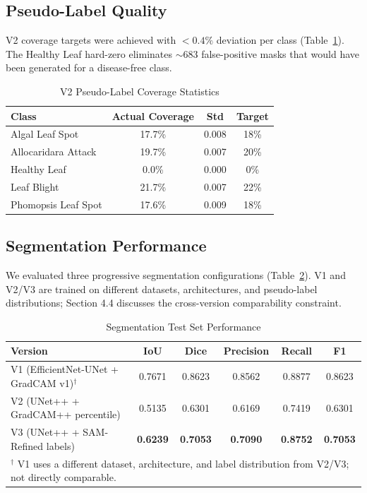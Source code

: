 \documentclass[10pt,a4paper]{article}
\begin{document}
\subsection{Pseudo-Label Quality}

V2 coverage targets were achieved with $<0.4\%$ deviation per class (Table~\ref{tab:v2_coverage}). The Healthy Leaf hard-zero eliminates $\sim$683 false-positive masks that would have been generated for a disease-free class.

\begin{table}[H]
\centering
\caption{V2 Pseudo-Label Coverage Statistics}
\label{tab:v2_coverage}
\begin{tabular}{lccc}
\toprule
\textbf{Class} & \textbf{Actual Coverage} & \textbf{Std} & \textbf{Target} \\
\midrule
Algal Leaf Spot     & 17.7\% & 0.008 & 18\% \\
Allocaridara Attack & 19.7\% & 0.007 & 20\% \\
Healthy Leaf        & 0.0\%  & 0.000 & 0\%  \\
Leaf Blight         & 21.7\% & 0.007 & 22\% \\
Phomopsis Leaf Spot & 17.6\% & 0.009 & 18\% \\
\bottomrule
\end{tabular}
\end{table}

\subsection{Segmentation Performance}

We evaluated three progressive segmentation configurations (Table~\ref{tab:segmentation}). V1 and V2/V3 are trained on different datasets, architectures, and pseudo-label distributions; Section 4.4 discusses the cross-version comparability constraint.

\begin{table}[H]
\centering
\caption{Segmentation Test Set Performance}
\label{tab:segmentation}
\begin{tabular}{lccccc}
\toprule
\textbf{Version} & \textbf{IoU} & \textbf{Dice} & \textbf{Precision} & \textbf{Recall} & \textbf{F1} \\
\midrule
V1 (EfficientNet-UNet + GradCAM v1)$^\dagger$ & 0.7671 & 0.8623 & 0.8562 & 0.8877 & 0.8623 \\
V2 (UNet++ + GradCAM++ percentile)            & 0.5135 & 0.6301 & 0.6169 & 0.7419 & 0.6301 \\
V3 (UNet++ + SAM-Refined labels)              & \textbf{0.6239} & \textbf{0.7053} & \textbf{0.7090} & \textbf{0.8752} & \textbf{0.7053} \\
\bottomrule
\multicolumn{6}{l}{\small $^\dagger$ V1 uses a different dataset, architecture, and label distribution from V2/V3; not directly comparable.}
\end{tabular}
\end{table}
\end{document}
